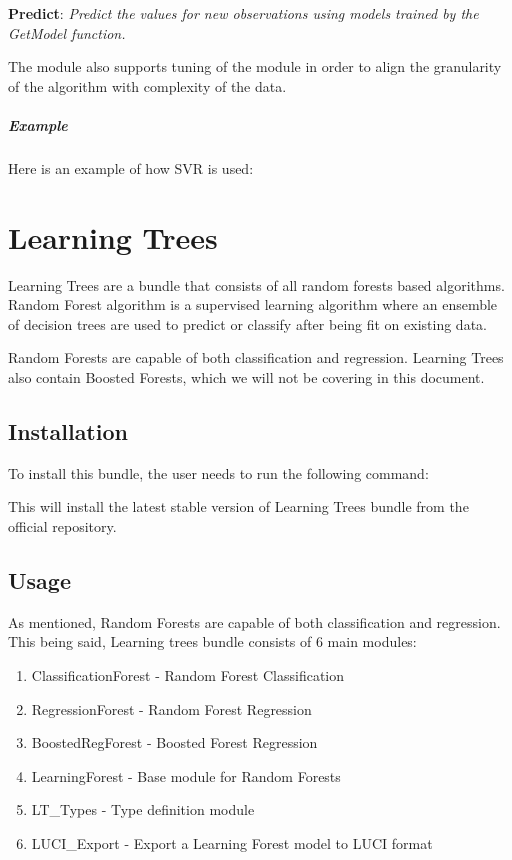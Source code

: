 \textbf{Predict}: \textit{Predict the values for new observations using models trained by the GetModel function.}

The module also supports tuning of the module in order to align the granularity of the algorithm with complexity of the data.

\paragraph{Example}

Here is an example of how SVR is used:



\chapter{Learning Trees}\label{supe:learntrees}

Learning Trees are a bundle that consists of all random forests based algorithms. Random Forest algorithm is a supervised learning algorithm where an ensemble of decision trees are used to predict or classify after being fit on existing data.

Random Forests are capable of both classification and regression. Learning Trees also contain Boosted Forests, which we will not be covering in this document.

\section{Installation}

To install this bundle, the user needs to run the following command:



This will install the latest stable version of Learning Trees bundle from the official repository.

\section{Usage}

As mentioned, Random Forests are capable of both classification and regression. This being said, Learning trees bundle consists of 6 main modules:

\begin{enumerate}
    \item ClassificationForest - Random Forest Classification
    \item RegressionForest - Random Forest Regression
    \item BoostedRegForest - Boosted Forest Regression
    \item LearningForest - Base module for Random Forests
    \item LT\_Types - Type definition module
    \item LUCI\_Export - Export a Learning Forest model to LUCI format
\end{enumerate}

